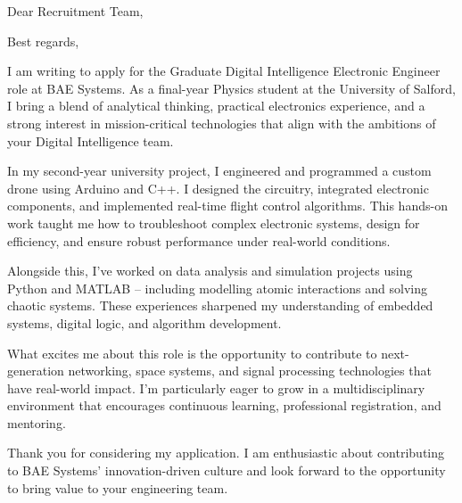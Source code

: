 \documentclass[11pt,a4paper,sans]{moderncv}
\begin{document}
\date{4 June 2025}
\opening{Dear Recruitment Team,}
\closing{Best regards,}
\makelettertitle

I am writing to apply for the Graduate Digital Intelligence Electronic Engineer role at BAE Systems. As a final-year Physics student at the University of Salford, I bring a blend of analytical thinking, practical electronics experience, and a strong interest in mission-critical technologies that align with the ambitions of your Digital Intelligence team.

In my second-year university project, I engineered and programmed a custom drone using Arduino and C++. I designed the circuitry, integrated electronic components, and implemented real-time flight control algorithms. This hands-on work taught me how to troubleshoot complex electronic systems, design for efficiency, and ensure robust performance under real-world conditions.

Alongside this, I’ve worked on data analysis and simulation projects using Python and MATLAB – including modelling atomic interactions and solving chaotic systems. These experiences sharpened my understanding of embedded systems, digital logic, and algorithm development.

What excites me about this role is the opportunity to contribute to next-generation networking, space systems, and signal processing technologies that have real-world impact. I’m particularly eager to grow in a multidisciplinary environment that encourages continuous learning, professional registration, and mentoring.

Thank you for considering my application. I am enthusiastic about contributing to BAE Systems' innovation-driven culture and look forward to the opportunity to bring value to your engineering team.

\makeletterclosing
\end{document}
